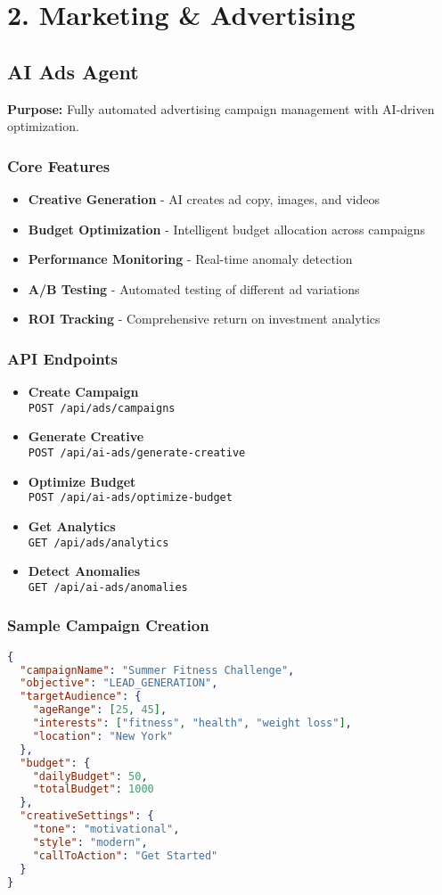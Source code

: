 \documentclass[12pt,a4paper]{article}
\newcommand{\apiendpoint}[2]{\textbf{#1} \\ \texttt{#2}}
\newcommand{\samplecode}[1]{\begin{lstlisting}[language=JSON]#1\end{lstlisting}}
\begin{document}
\section{2. Marketing \& Advertising}

\subsection{AI Ads Agent}
\textbf{Purpose:} Fully automated advertising campaign management with AI-driven optimization.

\subsubsection{Core Features}
\begin{itemize}
    \item \textbf{Creative Generation} - AI creates ad copy, images, and videos
    \item \textbf{Budget Optimization} - Intelligent budget allocation across campaigns
    \item \textbf{Performance Monitoring} - Real-time anomaly detection
    \item \textbf{A/B Testing} - Automated testing of different ad variations
    \item \textbf{ROI Tracking} - Comprehensive return on investment analytics
\end{itemize}

\subsubsection{API Endpoints}
\begin{itemize}
    \item \apiendpoint{Create Campaign}{POST /api/ads/campaigns}
    \item \apiendpoint{Generate Creative}{POST /api/ai-ads/generate-creative}
    \item \apiendpoint{Optimize Budget}{POST /api/ai-ads/optimize-budget}
    \item \apiendpoint{Get Analytics}{GET /api/ads/analytics}
    \item \apiendpoint{Detect Anomalies}{GET /api/ai-ads/anomalies}
\end{itemize}

\subsubsection{Sample Campaign Creation}
\samplecode{
{
  "campaignName": "Summer Fitness Challenge",
  "objective": "LEAD_GENERATION",
  "targetAudience": {
    "ageRange": [25, 45],
    "interests": ["fitness", "health", "weight loss"],
    "location": "New York"
  },
  "budget": {
    "dailyBudget": 50,
    "totalBudget": 1000
  },
  "creativeSettings": {
    "tone": "motivational",
    "style": "modern",
    "callToAction": "Get Started"
  }
}
}
\end{document}
